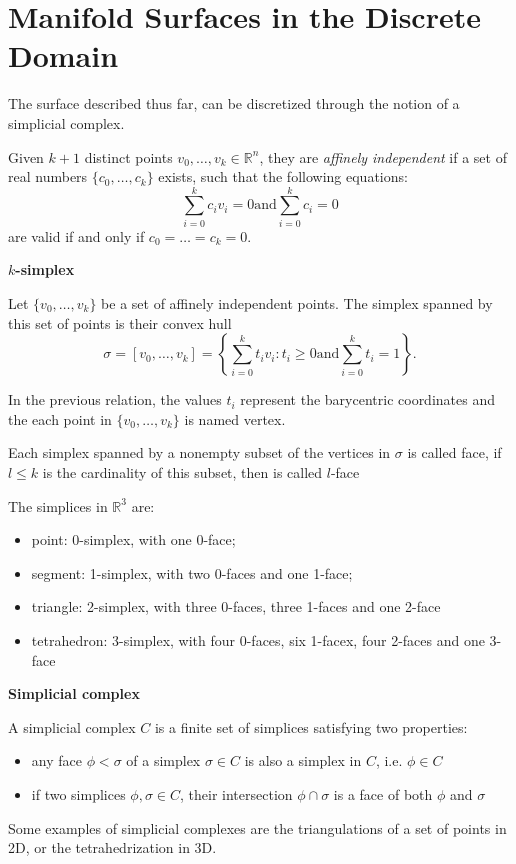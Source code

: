 \section{Manifold Surfaces in the Discrete Domain}
The surface described thus far, can be discretized through the notion of a simplicial complex. 

Given $k + 1$ distinct points $v_0, \dots, v_k \in \mathbb{R}^n$, they are \emph{affinely independent} if a set of real numbers $\{c_0, \dots, c_k \}$ exists, such that the following equations:
\[
\sum_{i=0}^k{c_i v_i} = 0 \text{and} \sum_{i=0}^k{c_i} = 0
\]
are valid if and only if   $c_0 = \dots = c_k = 0$.


\begin{mydef}
 \textbf{$k$-simplex} 
 
 Let $\{v_0, \dots, v_k\}$ be a set of affinely independent points. The simplex spanned by this set of points is their convex hull
 \[
 \sigma = [v_0, \dots, v_k] = \left\{ \sum_{i=0}^{k}{t_i v_i} : t_i \geq 0 \text{and}  \sum_{i=0}^{k}{t_i} = 1\right\}.
 \]
\end{mydef}
In the previous relation, the values $t_i$ represent the barycentric coordinates and the each point in $\{v_0, \dots, v_k\}$ is named vertex.

Each simplex spanned by a nonempty subset of the vertices in $\sigma$ is called face, if $l\leq k$ is the cardinality of this subset, then is called $l$-face

The simplices in $\mathbb{R}^3$ are:
\begin{itemize}
  \item point: 0-simplex, with one 0-face;
  \item segment: 1-simplex, with two 0-faces and one 1-face;
  \item triangle: 2-simplex, with three 0-faces, three 1-faces and one 2-face
  \item tetrahedron: 3-simplex, with four 0-faces, six 1-facex, four 2-faces and one 3-face
\end{itemize}

\begin{mydef}
\textbf{Simplicial complex}

A simplicial complex $C$ is a finite set of simplices satisfying two properties:
\begin{itemize}
  \item any face $\phi < \sigma$ of a simplex $\sigma \in C$ is also a simplex in $C$, i.e. $\phi \in C$
  \item if two simplices $\phi, \sigma \in C$, their intersection $\phi \cap \sigma$ is a face of both $\phi$ and $\sigma$
\end{itemize}
\end{mydef}
Some examples of simplicial complexes are the triangulations of a set of points in 2D, or the tetrahedrization in 3D.


